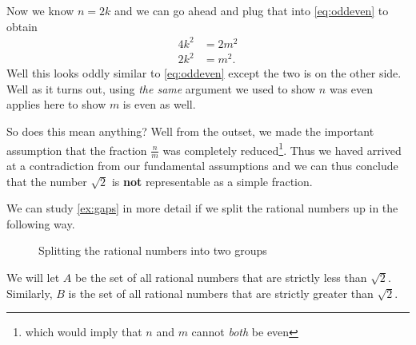 \documentclass[../../templates/section]{subfiles}
\begin{document}
\begin{example}
Now we know $n = 2k$ and we can go ahead and plug that into \cref{eq:oddeven}
to obtain
\begin{align}
    4k^2 & = 2m^2 \nonumber \\
    2k^2 & = m^2. \label{eq:m-is-even}
\end{align}
Well this looks oddly similar to \cref{eq:oddeven} except the two is on the
other side. Well as it turns out, using \emph{the same} argument we used to
show $n$ was even applies here to show $m$ is even as well.

So does this mean anything? Well from the outset, we made the important
assumption that the fraction $\frac{n}{m}$ was completely
reduced\footnote{which would imply that $n$ and $m$ cannot \emph{both} be
even}. Thus we haved arrived at a contradiction from our fundamental
assumptions and we can thus conclude that the number $\sqrt{2}$ is \textbf{not}
representable as a simple fraction.
\end{example}

We can study \cref{ex:gaps} in more detail if we split the rational numbers up
in the following way.
\begin{figure}
    \centering
\caption{Splitting the rational numbers into two groups}
\label{fig:split-rationals}
\end{figure}
We will let $A$ be the set of all rational numbers that are strictly
less than $\sqrt{2}$. Similarly, $B$ is the set of all rational numbers that
are strictly greater than $\sqrt{2}$.
\end{document}
